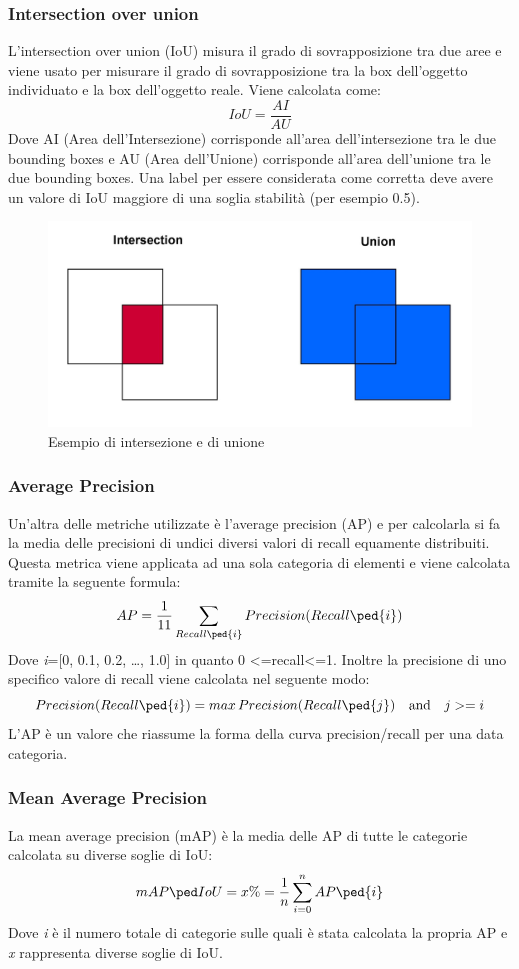 \subsubsection{Intersection over union}
L'intersection over union (IoU) misura il grado di sovrapposizione tra due aree e viene usato per misurare il grado di sovrapposizione tra la box dell'oggetto individuato e la box dell'oggetto reale. Viene calcolata come:
\[
    IoU = \frac{AI}{AU}
\]
Dove AI (Area dell'Intersezione) corrisponde all'area dell'intersezione tra le due bounding boxes e AU (Area dell'Unione) corrisponde all'area dell'unione tra le due bounding boxes.
Una label per essere considerata come corretta deve avere un valore di IoU maggiore di una soglia stabilità (per esempio 0.5).
\begin{figure}[H]
	\centering
	\includegraphics[width=0.5\linewidth]{images/unione-intersezione.jpg}
	\caption{Esempio di intersezione e di unione}
	\label{Esempio di intersezione e di unione}
\end{figure}
\subsubsection{Average Precision}
Un'altra delle metriche utilizzate è l'average precision (AP) e per calcolarla si fa la media delle precisioni di undici diversi valori di recall equamente distribuiti. Questa metrica viene applicata ad una sola categoria di elementi e viene calcolata tramite la seguente formula:
\[
    AP = \frac{1}{11}\sum_{Recall\ped{i}}^{} Precision(Recall\ped{i})
\]
Dove \textit{i}=[0, 0.1, 0.2, …, 1.0] in quanto 0 \textless =recall\textless =1. Inoltre la precisione di uno specifico valore di recall viene calcolata nel seguente modo:
\[
    Precision(Recall\ped{i}) = max\,Precision(Recall\ped{j}) \quad \textrm{and} \quad j>=i
\]
L'AP è un valore che riassume la forma della curva precision/recall per una data categoria.
\subsubsection{Mean Average Precision}
La mean average precision (mAP) è la media delle AP di tutte le categorie calcolata su diverse soglie di IoU:
\[
    mAP\ped{IoU=x\%} = \frac{1}{n}\sum_{i=0}^{n}AP\ped{i}
\]
Dove \textit{i} è il numero totale di categorie sulle quali è stata calcolata la propria AP e \textit{x} rappresenta diverse soglie di IoU.

